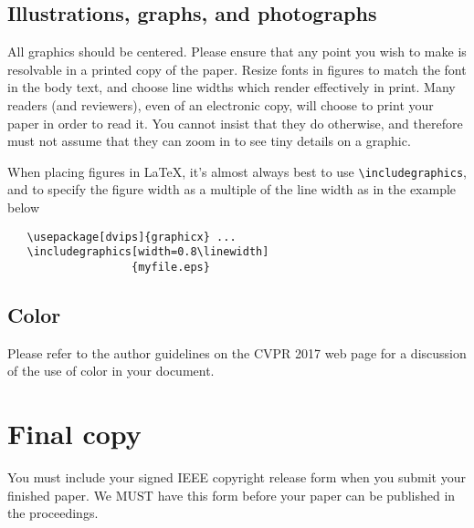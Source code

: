 \documentclass[10pt,twocolumn,letterpaper]{article}
\begin{document}
\subsection{Illustrations, graphs, and photographs}

All graphics should be centered.  Please ensure that any point you wish to
make is resolvable in a printed copy of the paper.  Resize fonts in figures
to match the font in the body text, and choose line widths which render
effectively in print.  Many readers (and reviewers), even of an electronic
copy, will choose to print your paper in order to read it.  You cannot
insist that they do otherwise, and therefore must not assume that they can
zoom in to see tiny details on a graphic.

When placing figures in \LaTeX, it's almost always best to use
\verb+\includegraphics+, and to specify the  figure width as a multiple of
the line width as in the example below
{\small\begin{verbatim}
   \usepackage[dvips]{graphicx} ...
   \includegraphics[width=0.8\linewidth]
                   {myfile.eps}
\end{verbatim}
}


\subsection{Color}

Please refer to the author guidelines on the CVPR 2017 web page for a discussion
of the use of color in your document.

\section{Final copy}

You must include your signed IEEE copyright release form when you submit
your finished paper. We MUST have this form before your paper can be
published in the proceedings.


{\small


}
\end{document}
